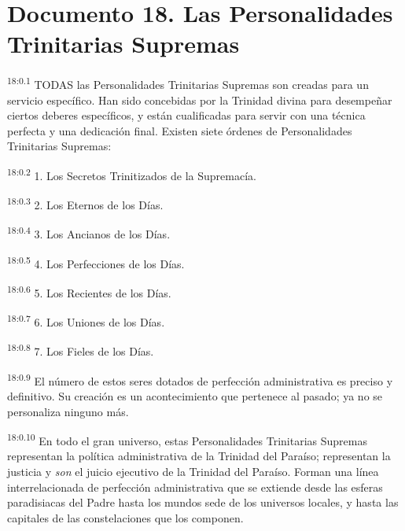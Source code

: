 \chapter{Documento 18. Las Personalidades Trinitarias Supremas}
\par
\textsuperscript{18:0.1} TODAS las Personalidades Trinitarias Supremas son creadas para un servicio específico. Han sido concebidas por la Trinidad divina para desempeñar ciertos deberes específicos, y están cualificadas para servir con una técnica perfecta y una dedicación final. Existen siete órdenes de Personalidades Trinitarias Supremas:

\par
\textsuperscript{18:0.2} 1. Los Secretos Trinitizados de la Supremacía.

\par
\textsuperscript{18:0.3} 2. Los Eternos de los Días.

\par
\textsuperscript{18:0.4} 3. Los Ancianos de los Días.

\par
\textsuperscript{18:0.5} 4. Los Perfecciones de los Días.

\par
\textsuperscript{18:0.6} 5. Los Recientes de los Días.

\par
\textsuperscript{18:0.7} 6. Los Uniones de los Días.

\par
\textsuperscript{18:0.8} 7. Los Fieles de los Días.

\par
\textsuperscript{18:0.9} El número de estos seres dotados de perfección administrativa es preciso y definitivo. Su creación es un acontecimiento que pertenece al pasado; ya no se personaliza ninguno más.

\par
\textsuperscript{18:0.10} En todo el gran universo, estas Personalidades Trinitarias Supremas representan la política administrativa de la Trinidad del Paraíso; representan la justicia y \textit{son} el juicio ejecutivo de la Trinidad del Paraíso. Forman una línea interrelacionada de perfección administrativa que se extiende desde las esferas paradisiacas del Padre hasta los mundos sede de los universos locales, y hasta las capitales de las constelaciones que los componen.

